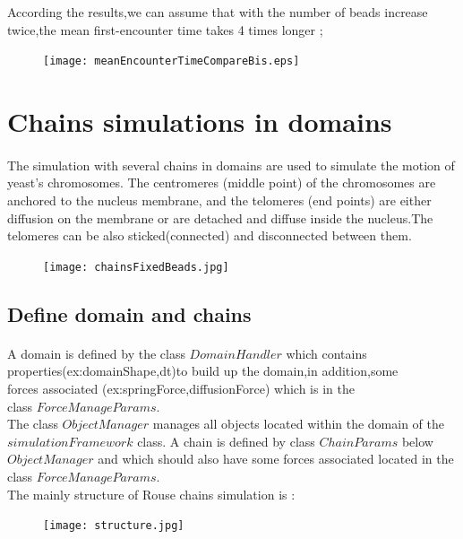 \documentclass{article}
\begin{document}
According the results,we can assume that with the number of beads increase twice,the mean first-encounter time takes 4 times longer ;  					
\begin{figure}[H]
	\centering
	\texttt{[image: meanEncounterTimeCompareBis.eps]}
\end{figure}
\section{Chains simulations in domains}
\paragraph{}
The simulation with several chains in domains are used to  
simulate the motion of yeast's chromosomes. The centromeres (middle 
point) of the chromosomes are anchored to the nucleus membrane,
and the telomeres (end points) are either diffusion on the membrane 
or are detached and diffuse inside the nucleus.The telomeres can be also sticked(connected) and disconnected between them.\\
\begin{figure}[H]
	\centering
	\texttt{[image: chainsFixedBeads.jpg]}	
\end{figure}
\subsection{Define domain and chains}
\paragraph{}
A domain is defined by the class $DomainHandler$ which contains \\
properties(ex:domainShape,dt)to build up the domain,in addition,some \\
forces associated (ex:springForce,diffusionForce) which is in the\\ class $ForceManageParams$.\\

The class $ObjectManager$ manages all objects located within the domain of the $simulationFramework$ class. A chain is defined by class $ChainParams$ 
below $ObjectManager$ and which should also have some forces associated located in the class $ForceManageParams$.\\	
The mainly structure of Rouse chains simulation is :\\
\begin{figure}[H]
	\texttt{[image: structure.jpg]}
\end{figure}
\end{document}
